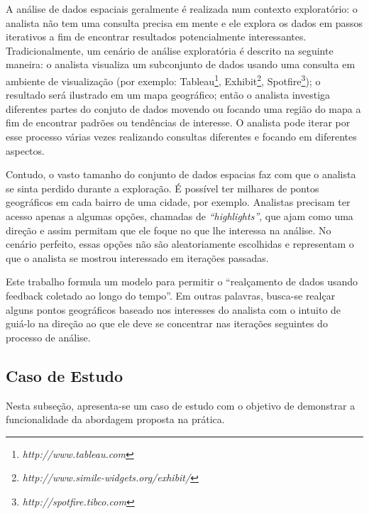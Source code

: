 A análise de dados espaciais geralmente é realizada num contexto exploratório: o analista não tem uma consulta precisa em mente e ele explora os dados em passos iterativos a fim de encontrar resultados potencialmente interessantes. Tradicionalmente, um cenário de análise exploratória é descrito na seguinte maneira: o analista visualiza um subconjunto de dados usando uma consulta em ambiente de visualização (por exemplo: Tableau\footnote{\it http://www.tableau.com},
Exhibit\footnote{\it http://www.simile-widgets.org/exhibit/},
Spotfire\footnote{\it http://spotfire.tibco.com}); o resultado será ilustrado em um mapa geográfico; então o analista investiga diferentes partes do conjuto de dados movendo ou focando uma região do mapa a fim de encontrar padrões ou tendências de interesse. O analista pode iterar por esse processo várias vezes realizando consultas diferentes e focando em diferentes aspectos.

Contudo, o vasto tamanho do conjunto de dados espacias faz com que o analista se sinta perdido durante a exploração. É possível ter milhares de pontos geográficos em cada bairro de uma cidade, por exemplo. Analistas precisam ter acesso apenas a algumas opções, chamadas de {\em ``highlights''}, que ajam como uma direção e assim permitam que ele foque no que lhe interessa na análise. No cenário perfeito, essas opções não são aleatoriamente escolhidas e representam o que o analista se mostrou interessado em iterações passadas.

Este trabalho formula um modelo para permitir o ``realçamento de dados usando feedback coletado ao longo do tempo''. Em outras palavras, busca-se realçar alguns pontos geográficos baseado nos interesses do analista com o intuito de guiá-lo na direção ao que ele deve se concentrar nas iterações seguintes do processo de análise.

\subsection{Caso de Estudo}

Nesta subseção, apresenta-se um caso de estudo com o objetivo de demonstrar a funcionalidade da abordagem proposta na prática.

